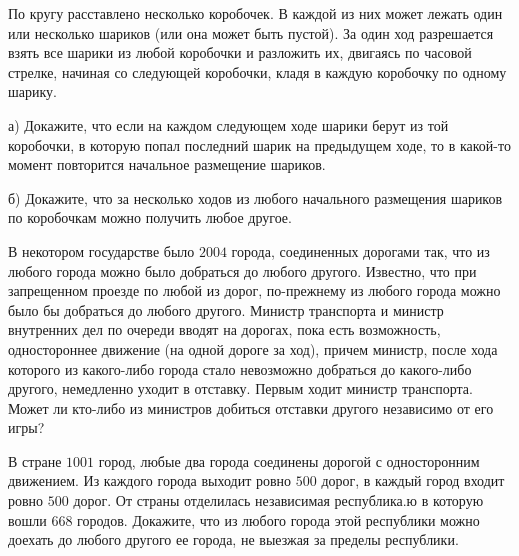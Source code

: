 \begin{exersize}
	По кругу расставлено несколько коробочек. В каждой из них может лежать один или несколько шариков (или она может быть пустой). 
	За один ход  разрешается взять все шарики из любой коробочки и разложить их, двигаясь по часовой стрелке, 
	начиная со следующей коробочки, кладя в каждую коробочку по одному шарику.
	
	а) Докажите, что если на каждом следующем ходе шарики берут из той коробочки, 
	в которую попал последний шарик на предыдущем ходе, то в какой-то момент повторится начальное размещение шариков.
	
	б) Докажите, что за несколько ходов из любого начального размещения шариков по коробочкам можно получить любое другое.
\end{exersize}	


\begin{exersize}
	В некотором государстве было $2004$ города, соединенных дорогами так, что из любого города 
	можно было добраться до любого другого. Известно, что при запрещенном проезде по любой из дорог, 
	по-прежнему из любого города можно было бы добраться до любого другого. Министр транспорта и министр 
	внутренних дел по очереди вводят на дорогах, пока есть возможность, одностороннее движение (на одной дороге за ход), 
	причем министр, после хода которого из какого-либо города стало невозможно добраться до какого-либо другого, 
	немедленно уходит в отставку. Первым ходит министр транспорта. 
	Может ли кто-либо из министров добиться отставки другого независимо от его игры?
\end{exersize}	

\begin{exersize}
	В стране $1001$ город, любые два города соединены дорогой с односторонним движением. 
	Из каждого города выходит ровно $500$ дорог, в каждый город входит ровно $500$ дорог. 
	От страны отделилась независимая республика.ю в которую вошли $668$ городов. 
	Докажите, что из любого города этой республики можно доехать до любого другого ее города, не выезжая за пределы республики.
\end{exersize}	 